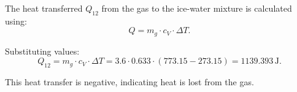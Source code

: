 The heat transferred \( Q_{12} \) from the gas to the ice-water mixture is calculated using:  
\[
Q = m_g \cdot c_V \cdot \Delta T.
\]  

Substituting values:  
\[
Q_{12} = m_g \cdot c_V \cdot \Delta T = 3.6 \cdot 0.633 \cdot (773.15 - 273.15) = 1139.393 \, \text{J}.
\]  

This heat transfer is negative, indicating heat is lost from the gas.
